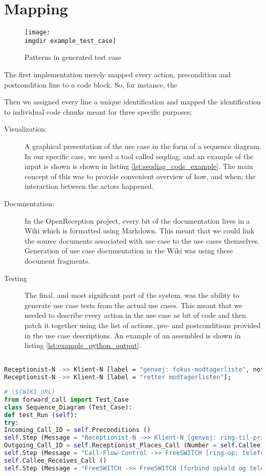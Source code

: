 \section{Mapping}

\begin{figure}[ht]
\centering
\texttt{[image: \\imgdir example\_test\_case]}
\caption{Patterns in generated test case}
\label{fig:domain_model}
\end{figure}
The first implementation merely mapped every action, precondition and postcondition line to a code block. So, for instance, the %

Then we assigned every line a unique identification and mapped the identification to individual code chunks meant for three specific purposes;
\begin{description}
  \item[Visualization:] A graphical presentation of the use case in the form of a sequence diagram. In our specific case, we used a tool called seqdiag, and an example of the input is shown is shown in listing \ref{lst:seqdiag_code_example}. The main concept of this was to provide convenient overview of how, and when, the interaction between the actors happened.
  \item[Documentation:] In the OpenReception project, every bit of the documentation lives in a Wiki which is formatted using Markdown. This meant that we could link the source documents associated with use case to the use cases themselves. Generation of use case documentation in the Wiki was using these document fragments.
  \item[Testing] The final, and most significant part of the system, was the ability to generate use case tests from the actual use cases. This meant that we needed to describe every action in the use case as bit of code and then patch it together using the list of actions, pre- and postconditions provided in the use case descriptions. An example of an assembled is shown in listing \ref{lst:example_python_output}.
\end{description}
\begin{lstlisting}[language=Bash, caption=Example seqdiag input, label=lst:seqdiag_code_example]

Receptionist-N ->> Klient-N [label = "genvej: fokus-modtagerliste", note = "maaske"];
Receptionist-N ->> Klient-N [label = "retter modtagerlisten"];
\end{lstlisting}

\begin{lstlisting}[language=Python, caption=Example Python code output, label=lst:example_python_output]
# \${WIKI_URL}
from forward_call import Test_Case
class Sequence_Diagram (Test_Case):
def test_Run (self):
try:
Incoming_Call_ID = self.Preconditions ()
self.Step (Message = "Receptionist-N ->> Klient-N [genvej: ring-til-primaert-nummer]")
Outgoing_Call_ID = self.Receptionist_Places_Call (Number = self.Callee.sip_uri ())
self.Step (Message = "Call-Flow-Control ->> FreeSWITCH [ring-op: telefon-N, nummer]")
self.Callee_Receives_Call ()
self.Step (Message = "FreeSWITCH ->> FreeSWITCH [forbind opkald og telefon-N]")
\end{lstlisting}

